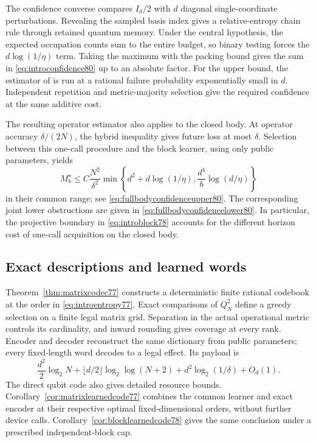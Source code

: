 The confidence converse compares $I_d/2$ with $d$ diagonal
single-coordinate perturbations.  Revealing the sampled basis
index gives a relative-entropy chain rule through retained quantum
memory.  Under the central hypothesis, the expected occupation
counts sum to the entire budget, so binary testing forces the
$d\log(1/\eta)$ term.  Taking the maximum with the packing
bound gives the sum in \eqref{eq:introconfidence80} up to an
absolute factor.  For the upper bound, the estimator of
\cite[Corollary~III.9]{MB67} is run at a rational failure
probability exponentially small in $d$.  Independent repetition
and metric-majority selection give the required confidence at the
same additive cost.

The resulting operator estimator also applies to the closed body.
At operator accuracy $\delta/(2N)$, the hybrid inequality gives
future loss at most $\delta$.  Selection between this one-call
procedure and the block learner, using only public parameters,
yields
\[
 M_b^\star\le C\frac{N^2}{\delta^2}
 \min\left\{d^2+d\log(1/\eta),\frac{d^4}{b}\log(d/\eta)\right\}
\]
in their common range; see
\eqref{eq:fullbodyconfidenceupper80}.  The corresponding joint
lower obstructions are given in
\eqref{eq:fullbodyconfidencelower80}.  In particular, the projective
boundary in \eqref{eq:introblock78} accounts for the different
horizon cost of one-call acquisition on the closed body.

\subsection{Exact descriptions and learned words}
Theorem~\ref{thm:matrixcodec77} constructs a deterministic finite
rational codebook at the order in \eqref{eq:introentropy77}.
Exact comparisons of $Q_N^2$ define a greedy selection on a finite
legal matrix grid.  Separation in the actual operational metric
controls its cardinality, and inward rounding gives coverage at
every rank.  Encoder and decoder reconstruct the same dictionary
from public parameters; every fixed-length word decodes to a legal
effect.  Its payload is
\[
 \frac{d^2}{2}\log_2N+
 \lfloor d/2\rfloor\log_2\log(N+2)
             +d^2\log_2(1/\delta)+O_d(1).
\]
The direct qubit code also gives detailed resource bounds.
Corollary~\ref{cor:matrixlearnedcode77} combines the common learner
and exact encoder at their respective optimal fixed-dimensional
orders, without further device calls.
Corollary~\ref{cor:blocklearnedcode78} gives the same conclusion
under a prescribed independent-block cap.

